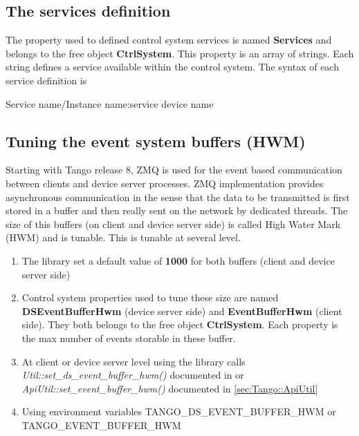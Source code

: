 \subsection{The services definition}

The property used to defined control system services is named \textbf{Services}
and belongs to the free object \textbf{CtrlSystem}.
This property is an array of strings. Each string defines a service
available within the control system. The syntax of each service definition
is \begin{center}Service name/Instance name:service device name\end{center}

\subsection{Tuning the event system buffers (HWM)}

Starting with Tango release 8, ZMQ is used for the event
based communication between clients and device server processes. ZMQ
implementation provides asynchronous communication in the sense that
the data to be transmitted is first stored in a buffer and then really
sent on the network by dedicated threads. The size of this buffers
(on client and device server side) is called High Water Mark (HWM)
and is tunable. This is tunable at several level.
\begin{enumerate}
\item The library set a default value of \textbf{1000} for both buffers
(client and device server side)
\item Control system properties used to tune these size are named \textbf{DSEventBufferHwm}
(device server side) and \textbf{EventBufferHwm}
(client side). They both belongs to the free object \textbf{CtrlSystem}.
Each property is the max number of events storable in these buffer.
\item At client or device server level using the library calls \emph{Util::set\_ds\_event\_buffer\_hwm()}
documented in \cite{Tango-dsclasses-doc} or \emph{ApiUtil::set\_event\_buffer\_hwm()
}documented in \ref{sec:Tango::ApiUtil}
\item Using environment variables TANGO\_DS\_EVENT\_BUFFER\_HWM
or TANGO\_EVENT\_BUFFER\_HWM
\end{enumerate}

